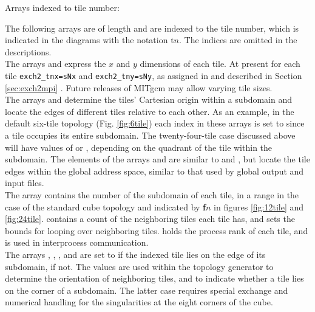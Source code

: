 Arrays indexed to tile number:

The following arrays are of length  and are indexed to
the tile number, which is indicated in the diagrams with the notation
\textsf{t}$n$.  The indices are omitted in the descriptions. \\

The arrays  and
 express the $x$ and $y$ dimensions of
each tile.  At present for each tile \texttt{exch2\_tnx=sNx} and
\texttt{exch2\_tny=sNy}, as assigned in  and described in
Section \ref{sec:exch2mpi} .  Future releases of MITgcm may allow varying tile
sizes. \\

The arrays  and
 determine the tiles' 
Cartesian origin within a subdomain  
and locate the edges of different tiles relative to each other.  As
an example, in the default six-tile topology (Fig. \ref{fig:6tile})
each index in these arrays is set to  since a tile occupies
its entire subdomain.  The twenty-four-tile case discussed above will
have values of  or , depending on the quadrant of the
tile within the subdomain.  The elements of the arrays
 and
 are similar to
 and
, but locate the tile edges within the
global address space, similar to that used by global output and input
files. \\

The array  contains the number of
the subdomain of each tile, in a range  in the case of the
standard cube topology and indicated by \textbf{\textsf{f}}$n$ in
figures \ref{fig:12tile} and
\ref{fig:24tile}. 
contains a count of the neighboring tiles each tile has, and sets 
the bounds for looping over neighboring tiles.
 holds the process rank of each
tile, and is used in interprocess communication.  \\


The arrays ,
,
, and
 are set to  if the
indexed tile lies on the edge of its subdomain,  if
not.  The values are used within the topology generator to determine
the orientation of neighboring tiles, and to indicate whether a tile
lies on the corner of a subdomain.  The latter case requires special
exchange and numerical handling for the singularities at the eight
corners of the cube. \\


